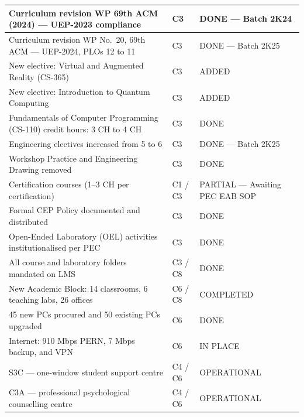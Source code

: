 \begin{longtable}{|p{6.7cm}|p{1.8cm}|p{6.5cm}|}
Curriculum revision WP 69th ACM (2024) --- UEP-2023 compliance
& C3
& DONE --- Batch 2K24 \\
\hline

Curriculum revision WP No.~20, 69th ACM --- UEP-2024, PLOs 12 to 11
& C3
& DONE --- Batch 2K25 \\
\hline

New elective: Virtual and Augmented Reality (CS-365)
& C3
& ADDED \\
\hline

New elective: Introduction to Quantum Computing
& C3
& ADDED \\
\hline

Fundamentals of Computer Programming (CS-110) credit hours: 3 CH to 4 CH
& C3
& DONE \\
\hline

Engineering electives increased from 5 to 6
& C3
& DONE --- Batch 2K25 \\
\hline

Workshop Practice and Engineering Drawing removed
& C3
& DONE \\
\hline

Certification courses (1--3 CH per certification)
& C1 / C3
& PARTIAL --- Awaiting PEC EAB SOP \\
\hline

Formal CEP Policy documented and distributed 
& C3
& DONE \\
\hline

Open-Ended Laboratory (OEL) activities institutionalised per PEC 
& C3
& DONE \\
\hline

All course and laboratory folders mandated on LMS
& C3 / C8
& DONE \\
\hline

New Academic Block: 14 classrooms, 6 teaching labs, 26 offices
& C6 / C8
& COMPLETED \\
\hline

45 new PCs procured and 50 existing PCs upgraded
& C6
& DONE \\
\hline

Internet: 910 Mbps PERN, 7 Mbps backup, and VPN
& C6
& IN PLACE \\
\hline

S3C --- one-window student support centre
& C4 / C6
& OPERATIONAL \\
\hline

C3A --- professional psychological counselling centre
& C4 / C6
& OPERATIONAL \\
\hline


\end{longtable}
